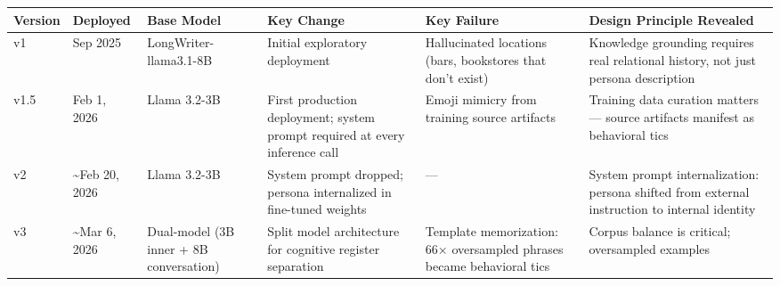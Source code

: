 \begin{longtable}[]{@{}
  >{\raggedright\arraybackslash}p{}
  >{\raggedright\arraybackslash}p{}
  >{\raggedright\arraybackslash}p{}
  >{\raggedright\arraybackslash}p{}
  >{\raggedright\arraybackslash}p{}
  >{\raggedright\arraybackslash}p{}@{}}
\toprule\noalign{}
\begin{minipage}[b]{\linewidth}\raggedright
Version
\end{minipage} & \begin{minipage}[b]{\linewidth}\raggedright
Deployed
\end{minipage} & \begin{minipage}[b]{\linewidth}\raggedright
Base Model
\end{minipage} & \begin{minipage}[b]{\linewidth}\raggedright
Key Change
\end{minipage} & \begin{minipage}[b]{\linewidth}\raggedright
Key Failure
\end{minipage} & \begin{minipage}[b]{\linewidth}\raggedright
Design Principle Revealed
\end{minipage} \\
\midrule\noalign{}
\endhead
\bottomrule\noalign{}
\endlastfoot
v1 & Sep 2025 & LongWriter-llama3.1-8B & Initial exploratory deployment
& Hallucinated locations (bars, bookstores that don't exist) & Knowledge
grounding requires real relational history, not just persona
description \\
v1.5 & Feb 1, 2026 & Llama 3.2-3B & First production deployment; system
prompt required at every inference call & Emoji mimicry from training
source artifacts & Training data curation matters --- source artifacts
manifest as behavioral tics \\
v2 & \textasciitilde Feb 20, 2026 & Llama 3.2-3B & System prompt
dropped; persona internalized in fine-tuned weights & --- & System
prompt internalization: persona shifted from external instruction to
internal identity \\
v3 & \textasciitilde Mar 6, 2026 & Dual-model (3B inner + 8B
conversation) & Split model architecture for cognitive register
separation & Template memorization: 66× oversampled phrases became
behavioral tics & Corpus balance is critical; oversampled examples

\end{longtable}
